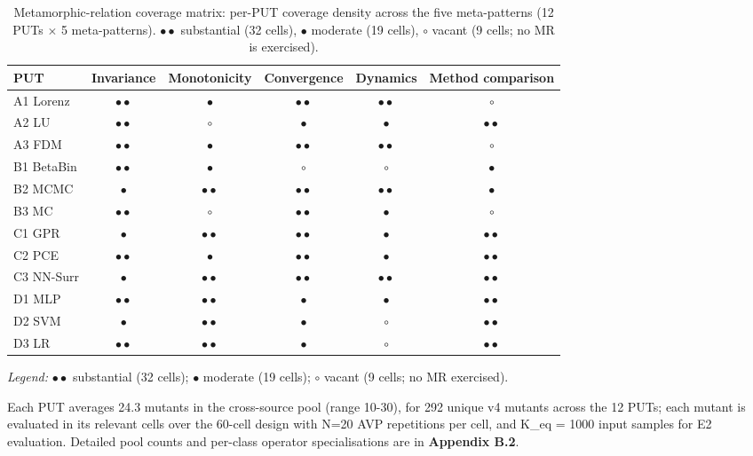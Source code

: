 \documentclass[manuscript,screen,review]{acmart}
\begin{document}
{%
\small
\begin{longtable}[]{@{}lccccc@{}}
\caption{Metamorphic-relation coverage matrix: per-PUT coverage density across the five meta-patterns (12 PUTs $\times$ 5 meta-patterns). $\bullet\bullet$ substantial (32 cells), $\bullet$ moderate (19 cells), $\circ$ vacant (9 cells; no MR is exercised).}\label{tab:p2-cells}\\
\toprule\noalign{}
PUT & Invariance & Monotonicity & Convergence & Dynamics & Method comparison \\
\midrule\noalign{}
\endfirsthead
\endhead
\bottomrule\noalign{}
\endlastfoot
A1 Lorenz  & $\bullet\bullet$ & $\bullet$ & $\bullet\bullet$ & $\bullet\bullet$ & $\circ$ \\
A2 LU      & $\bullet\bullet$ & $\circ$ & $\bullet$ & $\bullet$ & $\bullet\bullet$ \\
A3 FDM     & $\bullet\bullet$ & $\bullet$ & $\bullet\bullet$ & $\bullet\bullet$ & $\circ$ \\
B1 BetaBin & $\bullet\bullet$ & $\bullet$ & $\circ$ & $\circ$ & $\bullet$ \\
B2 MCMC    & $\bullet$ & $\bullet\bullet$ & $\bullet\bullet$ & $\bullet\bullet$ & $\bullet$ \\
B3 MC      & $\bullet\bullet$ & $\circ$ & $\bullet\bullet$ & $\bullet$ & $\circ$ \\
C1 GPR     & $\bullet$ & $\bullet\bullet$ & $\bullet\bullet$ & $\bullet$ & $\bullet\bullet$ \\
C2 PCE     & $\bullet\bullet$ & $\bullet$ & $\bullet\bullet$ & $\bullet$ & $\bullet\bullet$ \\
C3 NN-Surr & $\bullet$ & $\bullet\bullet$ & $\bullet\bullet$ & $\bullet\bullet$ & $\bullet\bullet$ \\
D1 MLP     & $\bullet\bullet$ & $\bullet\bullet$ & $\bullet$ & $\bullet$ & $\bullet\bullet$ \\
D2 SVM     & $\bullet$ & $\bullet\bullet$ & $\bullet$ & $\circ$ & $\bullet\bullet$ \\
D3 LR      & $\bullet\bullet$ & $\bullet\bullet$ & $\bullet$ & $\circ$ & $\bullet\bullet$ \\
\end{longtable}
}

\noindent\emph{Legend:} $\bullet\bullet$ substantial (32 cells); $\bullet$ moderate (19 cells); $\circ$ vacant (9 cells; no MR exercised).

Each PUT averages 24.3 mutants in the cross-source pool (range
10-30), for 292 unique v4 mutants across the 12 PUTs; each mutant is
evaluated in its relevant cells over the 60-cell design with N=20 AVP
repetitions per cell, and K\_eq = 1000 input samples for E2 evaluation. Detailed
pool counts and per-class operator specialisations are in
\textbf{Appendix B.2}.
\end{document}
